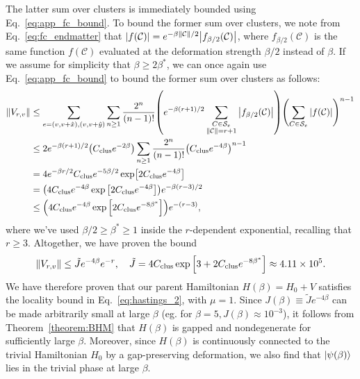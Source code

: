 The latter sum over clusters is immediately bounded using Eq.~\eqref{eq:app_fc_bound}. To bound the former sum over clusters, we note from Eq.~\eqref{eq:fc_endmatter} that $\abs{f(\mathcal{C})} = e^{-\beta \norm{\mathcal{C}} / 2} \abs{f_{\beta / 2}(\mathcal{C})}$, where $f_{\beta/2}(\mathcal{C})$ is the same function $f(\mathcal{C})$ evaluated at the deformation strength $\beta / 2$ instead of $\beta$. If we assume for simplicity that $\beta \geq 2 \beta^*$, we can once again use Eq.~\eqref{eq:app_fc_bound} to bound the former sum over clusters as follows:
\begin{subequations}
\label{eq:vbound_app_2}
    \begin{align}
        \norm{V_{r, v}} &\leq \sum_{e = (v, v + \hat{x}), (v, v + \hat{y})} \sum_{n \geq 1} \frac{2^n}{(n-1)!} \qty( e^{-\beta (r + 1) / 2} \sum_{\substack{C \in \mathcal{S}_e \\ \norm{\mathcal{C}} = r + 1}} \abs{f_{\beta / 2}(\mathcal{C})} ) \qty( \sum_{C \in \mathcal{S}_e} \abs{f(\mathcal{C})} )^{n-1} \\
        &\leq 2e^{- \beta (r + 1) / 2} \qty( C_{\mathrm{clus}} e^{-2 \beta} ) \sum_{n \geq 1} \frac{2^n}{(n-1)!} \qty( C_{\mathrm{clus}} e^{-4\beta} )^{n-1} \\
        &= 4 e^{-\beta r / 2} C_{\mathrm{clus}} e^{-5\beta / 2} \exp[ 2 C_{\mathrm{clus}} e^{-4\beta} ] \\
        &= \qty( 4 C_{\mathrm{clus}} e^{-4\beta} \exp \qty[ 2 C_{\mathrm{clus}} e^{-4\beta} ] ) e^{-\beta(r - 3) / 2} \\
        &\leq \qty( 4 C_{\mathrm{clus}} e^{-4\beta} \exp \qty[ 2 C_{\mathrm{clus}} e^{-8\beta^*} ] ) e^{-(r-3)} ,
    \end{align}
\end{subequations}
where we've used $\beta / 2 \geq \beta^* \geq 1$ inside the $r$-dependent exponential, recalling that $r \geq 3$. Altogether, we have proven the bound
\begin{equation}
\label{eq:vbound_app_final}
    \norm{V_{r,v}} \leq \tilde{J} e^{-4\beta} e^{-r}, \quad \tilde{J} = 4C_{\mathrm{clus}} \exp \qty[ 3 + 2C_{\mathrm{clus}} e^{-8\beta^*} ]  \approx 4.11 \times 10^5 .
\end{equation}
We have therefore proven that our parent Hamiltonian $H(\beta) = H_0 + V$ satisfies the locality bound in Eq.~\eqref{eq:hastings_2}, with $\mu = 1$. Since $J(\beta) \equiv \tilde{J} e^{-4\beta}$ can be made arbitrarily small at large $\beta$ (eg. for $\beta = 5, J(\beta) \approx 10^{-3}$), it follows from Theorem~\ref{theorem:BHM} that $H(\beta)$ is gapped and nondegenerate for sufficiently large $\beta$. Moreover, since $H(\beta)$ is continuously connected to the trivial Hamiltonian $H_0$ by a gap-preserving deformation, we also find that $\ket{\psi(\beta)}$ lies in the trivial phase at large $\beta$.









